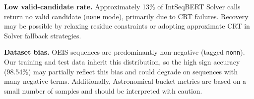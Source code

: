 \textbf{Low valid-candidate rate.} Approximately 13\% of IntSeqBERT Solver calls return no
valid candidate (\texttt{none} mode), primarily due to CRT failures. Recovery may be possible
by relaxing residue constraints or adopting approximate CRT in Solver fallback strategies.

\textbf{Dataset bias.} OEIS sequences are predominantly non-negative
(tagged \texttt{nonn}\hspace{0pt}). Our training and test data inherit this
distribution, so the high sign accuracy (98.54\%) may partially reflect this
bias and could degrade on sequences with many negative terms.
Additionally, Astronomical-bucket metrics are based on a small number of samples and should
be interpreted with caution.
